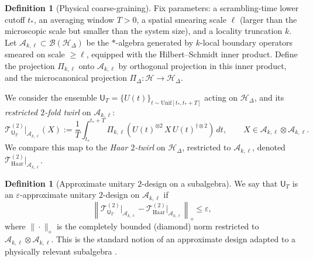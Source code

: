 \documentclass[aps,prd,preprint,onecolumn,superscriptaddress,nofootinbib,longbibliography,floatfix,11pt,showpacs,showkeys]{revtex4-2}
\theoremstyle{plain}
\theoremstyle{definition}
\newtheorem{definition}[theorem]{Definition}
\theoremstyle{remark}
\begin{document}
\begin{definition}[Physical coarse-graining]\label{def:CG}
Fix parameters: a scrambling-time lower cutoff $t_\ast$, an averaging window $T>0$, a spatial smearing scale $\ell$ (larger than the microscopic scale but smaller than the system size), and a locality truncation $k$.  Let $\mathscr{A}_{k,\ell}\subset \mathcal{B}(\mathcal{H}_\Delta)$ be the $*$-algebra generated by $k$-local boundary operators smeared on scale $\ge \ell$, equipped with the Hilbert--Schmidt inner product.  Define the projection $\Pi_{k,\ell}$ onto $\mathscr{A}_{k,\ell}$ by orthogonal projection in this inner product, and the microcanonical projection $\Pi_\Delta:\mathcal{H}\to\mathcal{H}_\Delta$.

We consider the ensemble $\mathsf{U}_{T}=\{U(t)\}_{t\sim \mathrm{Unif}[t_\ast,t_\ast+T]}$ acting on $\mathcal{H}_\Delta$, and its {\em restricted $2$-fold twirl} on $\mathscr{A}_{k,\ell}$:
\begin{equation}
  \mathcal{T}^{(2)}_{\mathsf{U}_T}\big|_{\mathscr{A}_{k,\ell}}(X)
  := \frac{1}{T}\int_{t_\ast}^{t_\ast+T}
   \Pi_{k,\ell}\!\left(U(t)^{\otimes 2}\, X \, U(t)^{\dagger\otimes 2}\right)\,dt,
  \qquad X\in \mathscr{A}_{k,\ell}\otimes \mathscr{A}_{k,\ell}.
\end{equation}
We compare this map to the {\em Haar $2$-twirl} on $\mathcal{H}_\Delta$, restricted to $\mathscr{A}_{k,\ell}$, denoted $\mathcal{T}^{(2)}_{\mathrm{Haar}}\big|_{\mathscr{A}_{k,\ell}}$.
\end{definition}

\begin{definition}[Approximate unitary $2$-design on a subalgebra]\label{def:approx-2design}
We say that $\mathsf{U}_{T}$ is an $\varepsilon$-approximate unitary $2$-design on $\mathscr{A}_{k,\ell}$ if
\begin{equation}
 \left\| \mathcal{T}^{(2)}_{\mathsf{U}_T}\big|_{\mathscr{A}_{k,\ell}} - \mathcal{T}^{(2)}_{\mathrm{Haar}}\big|_{\mathscr{A}_{k,\ell}} \right\|_{\diamond} \le \varepsilon,
\end{equation}
where $\|\cdot\|_\diamond$ is the completely bounded (diamond) norm restricted to $\mathscr{A}_{k,\ell}\otimes\mathscr{A}_{k,\ell}$.  This is the standard notion of an approximate design adapted to a physically relevant subalgebra \cite{Brandao:2016,RobertsYoshida:2017}.
\end{definition}
\end{document}
